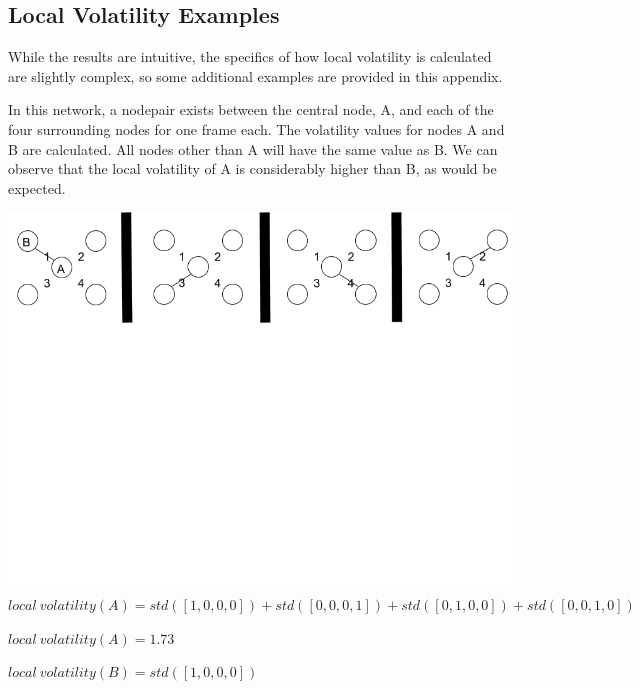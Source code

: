\documentclass[oneside,12pt]{Classes/RoboticsLaTeX}
\begin{document}
\appendix
%
%

\renewcommand{\bibname}{References}           %
\nocite{*}
\begin{appendices}
\chapter{Local Volatility Examples}

While the results are intuitive, the specifics of how local volatility is calculated are slightly complex, so some additional examples are provided in this appendix.

\label{appendix:appendixA}
In this network, a nodepair exists between the central node, A, and each of the four surrounding nodes for one frame each. The volatility values for nodes A and B are calculated. All nodes other than A will have the same value as B. We can observe that the local volatility of A is considerably higher than B, as would be expected.
\begin{center}
\includegraphics[trim={0 15cm 0 0}, width=140mm]{./Figures/volatilityAppendix1.png}
$local\ volatility(A) = std([1,0,0,0]) + std([0,0,0,1]) + std([0,1,0,0]) + std([0,0,1,0])$

$local\ volatility(A) = 1.73$

$local\ volatility(B) = std([1,0,0,0])$


\end{center}
\end{appendices}
\end{document}
